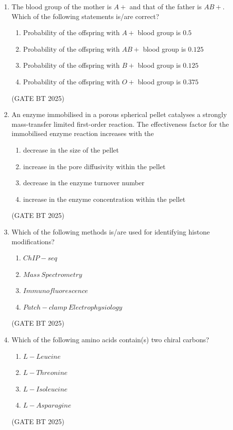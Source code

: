 \documentclass[journal,12pt,onecolumn]{IEEEtran}
\theoremstyle{remark}
\begin{document}
\begin{enumerate}
\item The blood group of the mother is $A+$ and that of the father is $AB+$. Which of the following statements is/are correct?

\begin{enumerate}
    \item Probability of the offspring with $A+$ blood group is $0.5$
    \item Probability of the offspring with $AB+$ blood group is $0.125$
    \item Probability of the offspring with $B+$ blood group is $0.125$
    \item Probability of the offspring with $O+$ blood group is $0.375$
\end{enumerate}
\hfill (GATE BT 2025)

\item An enzyme immobilised in a porous spherical pellet catalyses a strongly mass-transfer limited first-order reaction. The effectiveness factor for the immobilised enzyme reaction increases with the

\begin{enumerate}
    \item decrease in the size of the pellet
    \item increase in the pore diffusivity within the pellet
    \item decrease in the enzyme turnover number
    \item increase in the enzyme concentration within the pellet
\end{enumerate}
\hfill (GATE BT 2025)

\item Which of the following methods is/are used for identifying histone modifications?

\begin{enumerate}
    \item $ChIP\!-\!seq$
    \item $Mass\ Spectrometry$
    \item $Immunofluorescence$
    \item $Patch\!-\!clamp\ Electrophysiology$
\end{enumerate}
\hfill (GATE BT 2025)

\item Which of the following amino acids contain(s) two chiral carbons?

\begin{enumerate}
    \item $L\!-\!Leucine$
    \item $L\!-\!Threonine$
    \item $L\!-\!Isoleucine$
    \item $L\!-\!Asparagine$
\end{enumerate}
\hfill (GATE BT 2025)


\end{enumerate}
\end{document}
